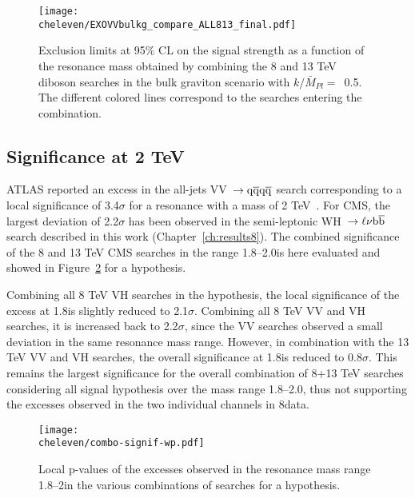 \begin{figure}[!htb]
\centering
\texttt{[image: \\cheleven/EXOVVbulkg\_compare\_ALL813\_final.pdf]}
\caption{
Exclusion limits at 95\% CL on the signal strength as a function of the resonance mass obtained by combining the 8 and 13 TeV diboson searches in the bulk graviton scenario with $k/\bar{M}_{Pl}=$~0.5. The different colored lines correspond to the searches entering the combination.}
\label{fig:bulkgall_138TeV}
\end{figure}

\subsection{Significance at 2 TeV}

ATLAS reported an excess in the all-jets VV~$\to\mathrm{q}\overline{\mathrm{q}}\mathrm{q}\overline{\mathrm{q}}$ search corresponding to a local significance of 3.4$\sigma$ for a \Wpr resonance with a mass of 2 TeV~\cite{Aad:2015owa}.
For CMS, the largest deviation of 2.2$\sigma$ has been observed in the semi-leptonic WH~$\to \ell \nu {\mathrm{b}\overline{\mathrm{b}}}$ search described in this work (Chapter~\ref{ch:results8}).
The combined significance of the 8 and 13 TeV CMS searches in the range 1.8--2.0\TeV is here evaluated and showed in Figure~\ref{fig:comboSignif} for a \Wpr hypothesis.

Combining all 8 TeV VH searches in the \Wpr hypothesis, the local significance of the excess at 1.8\TeV is slightly reduced to 2.1$\sigma$.
Combining all 8 TeV VV and VH searches, it is increased back to 2.2$\sigma$, since the VV searches observed a small deviation in the same resonance mass range.
However, in combination with the 13 TeV VV and VH searches, the overall significance at 1.8\TeV is reduced to 0.8$\sigma$.
This remains the largest significance for the overall combination of 8+13 TeV searches considering all signal hypothesis over the mass range 1.8--2.0\TeV,
thus not supporting the excesses observed in the two individual channels in 8\TeV data.

\begin{figure}[!htb]
\centering
\texttt{[image: \\cheleven/combo-signif-wp.pdf]}
\caption{Local p-values of the excesses observed in the resonance mass range 1.8--2\TeV in the various combinations of searches for a \Wpr hypothesis.}
\label{fig:comboSignif}
\end{figure}

